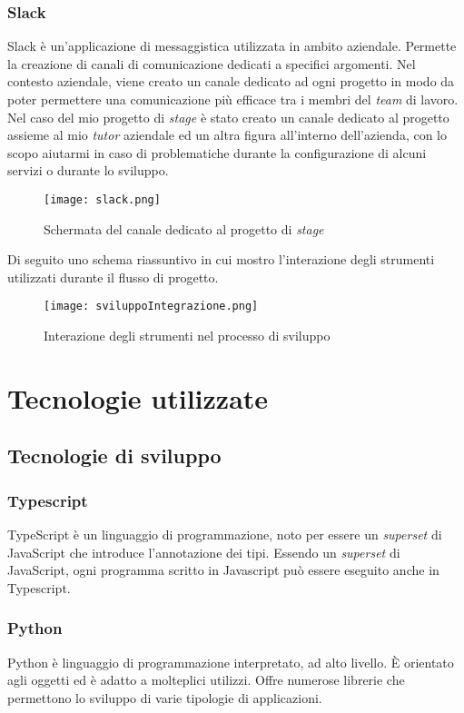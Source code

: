 \subsubsection{Slack}
Slack è un'applicazione di messaggistica utilizzata in ambito aziendale.
Permette la creazione di canali di comunicazione dedicati a specifici argomenti. Nel contesto aziendale, viene creato un canale dedicato ad ogni progetto in modo da poter permettere una comunicazione più efficace tra i membri del \textit{team} di lavoro.
Nel caso del mio progetto di \textit{stage} è stato creato un canale dedicato al progetto assieme al mio \textit{tutor} aziendale ed un altra figura all'interno dell'azienda, con lo scopo aiutarmi in caso di problematiche durante la configurazione di alcuni servizi o durante lo sviluppo.
\begin{figure}[H]
    \centering
    \texttt{[image: slack.png]}
    \caption{Schermata del canale dedicato al progetto di \textit{stage}}
    \label{fig:Slack}
\end{figure}
\noindent
Di seguito uno schema riassuntivo in cui mostro l'interazione degli strumenti utilizzati durante il flusso di progetto.
\begin{figure}[H]
    \centering
    \texttt{[image: sviluppoIntegrazione.png]}
    \caption{Interazione degli strumenti nel processo di sviluppo}
    \label{fig:sviluppoIntegrazione}
\end{figure}

\section{Tecnologie utilizzate}
\subsection{Tecnologie di sviluppo}
\subsubsection{Typescript}
TypeScript è un linguaggio di programmazione, noto per essere un \textit{superset} di JavaScript che introduce l'annotazione dei tipi. Essendo un \textit{superset} di JavaScript, ogni programma scritto in Javascript può essere eseguito anche in Typescript.

\subsubsection{Python}
Python è linguaggio di programmazione interpretato, ad alto livello. È orientato agli oggetti ed è adatto a molteplici utilizzi. Offre numerose librerie che permettono lo sviluppo di varie tipologie di applicazioni. 
